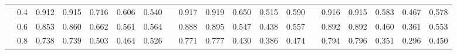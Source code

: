 \begin{table}
{\begin{tabular}{llccccccccccccccccc}
 & 0.4 & \cellcolor[HTML]{DCF1F7}0.912 & \cellcolor[HTML]{D7EFF5}0.915 & \cellcolor[HTML]{FEDC8C}0.716 & \cellcolor[HTML]{FEC475}0.606 & \cellcolor[HTML]{FEB96B}0.540 & & \cellcolor[HTML]{D1EBF4}0.917 & \cellcolor[HTML]{CEEAF3}0.919 & \cellcolor[HTML]{FED586}0.650 & \cellcolor[HTML]{FEBE70}0.515 & \cellcolor[HTML]{FFCA7B}0.590 & & \cellcolor[HTML]{C6E6F0}0.916 & \cellcolor[HTML]{C7E7F1}0.915 & \cellcolor[HTML]{FFD283}0.583 & \cellcolor[HTML]{FEC173}0.467 & \cellcolor[HTML]{FFD182}0.578 \\
 & 0.6 & \cellcolor[HTML]{FFFFBF}0.853 & \cellcolor[HTML]{FDFEC4}0.860 & \cellcolor[HTML]{FFCF80}0.662 & \cellcolor[HTML]{FEBC6E}0.561 & \cellcolor[HTML]{FEBD6E}0.564 & & \cellcolor[HTML]{EDF7E4}0.888 & \cellcolor[HTML]{E8F6EB}0.895 & \cellcolor[HTML]{FEC374}0.547 & \cellcolor[HTML]{FEB467}0.438 & \cellcolor[HTML]{FEC576}0.557 & & \cellcolor[HTML]{E3F4F4}0.892 & \cellcolor[HTML]{E3F4F4}0.892 & \cellcolor[HTML]{FEC072}0.460 & \cellcolor[HTML]{FEB567}0.361 & \cellcolor[HTML]{FFCD7E}0.553 \\
 & 0.8 & \cellcolor[HTML]{FEE192}0.738 & \cellcolor[HTML]{FEE192}0.739 & \cellcolor[HTML]{FDB366}0.503 & \cellcolor[HTML]{FDAE61}0.464 & \cellcolor[HTML]{FEB769}0.526 & & \cellcolor[HTML]{FFEDA3}0.771 & \cellcolor[HTML]{FFEEA5}0.777 & \cellcolor[HTML]{FDB366}0.430 & \cellcolor[HTML]{FDAE61}0.386 & \cellcolor[HTML]{FEB96B}0.474 & & \cellcolor[HTML]{FFF8B4}0.794 & \cellcolor[HTML]{FFF8B5}0.796 & \cellcolor[HTML]{FDB466}0.351 & \cellcolor[HTML]{FDAE61}0.296 & \cellcolor[HTML]{FEBF71}0.450 \\
\hline
\hline
\end{tabular}%
}
\end{table}

